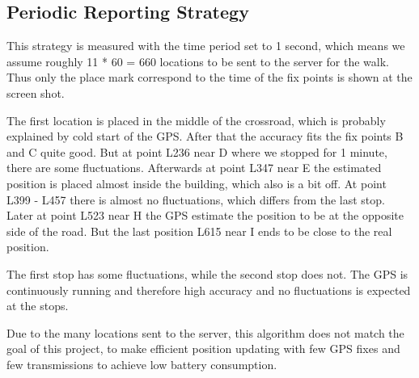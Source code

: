 \subsection{Periodic Reporting Strategy}
This strategy is measured with the time period set to 1 second, which means we assume roughly 11 * 60 = 660 locations to be sent to the server for the walk. Thus only the place mark correspond to the time of the fix points is shown at the screen shot. 

The first location is placed in the middle of the crossroad, which is probably explained by cold start of the GPS. After that the accuracy fits the fix points B and C quite good. But at point L236 near D where we stopped for 1 minute, there are some fluctuations. Afterwards at point L347 near E the estimated position is placed almost inside the building, which also is a bit off. At point L399 - L457 there is almost no fluctuations, which differs from the last stop. Later at point L523 near H the GPS estimate the position to be at the opposite side of the road. But the last position L615 near I ends to be close to the real position.

The first stop has some fluctuations, while the second stop does not. The GPS is continuously running and therefore high accuracy and no fluctuations is expected at the stops.

Due to the many locations sent to the server, this algorithm does not match the goal of this project, to make efficient position updating with few GPS fixes and few transmissions to achieve low battery consumption.